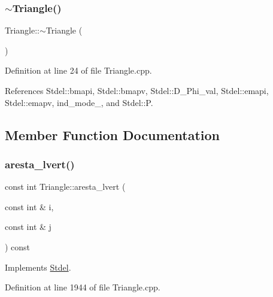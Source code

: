 \mbox{\label{classTriangle_a5199760a17454f4dc94c855a57e3a152}} 
\subsubsection{\texorpdfstring{$\sim$\+Triangle()}{~Triangle()}}
{\footnotesize\ttfamily Triangle\+::$\sim$\+Triangle (\begin{DoxyParamCaption}{ }\end{DoxyParamCaption})}



Definition at line 24 of file Triangle.\+cpp.



References Stdel\+::bmapi, Stdel\+::bmapv, Stdel\+::\+D\+\_\+\+Phi\+\_\+val, Stdel\+::emapi, Stdel\+::emapv, ind\+\_\+mode\+\_\+, and Stdel\+::P.



\subsection{Member Function Documentation}
\mbox{\label{classTriangle_a55b14526652cdeaff82e07083c36a7ba}} 
\subsubsection{\texorpdfstring{aresta\+\_\+lvert()}{aresta\_lvert()}}
{\footnotesize\ttfamily const int Triangle\+::aresta\+\_\+lvert (\begin{DoxyParamCaption}\item[{const int \&}]{i,  }\item[{const int \&}]{j }\end{DoxyParamCaption}) const\hspace{0.3cm}{\ttfamily [virtual]}}



Implements \hyperlink{classStdel_a69b8ef7def7891fcb2d5d8fd9b75bdc8}{Stdel}.



Definition at line 1944 of file Triangle.\+cpp.

\mbox{\label{classTriangle_a1884216b14c0432a2a56c12da809fb37}} 
